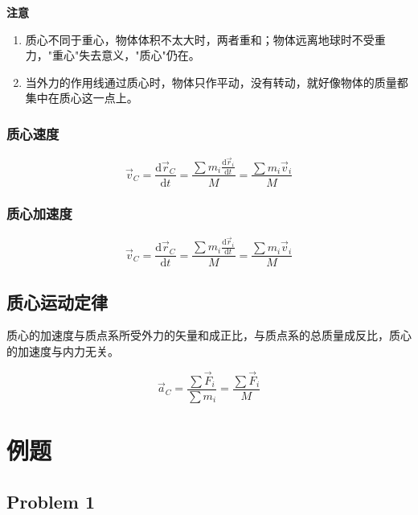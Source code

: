 \documentclass[
	12pt, %
	a4paper, %
]{myLegrandOrangeBook}
\newcommand{\rmd}{\mathrm{d}}
\begin{document}
\textbf{注意}

\begin{enumerate}
    \item 质心不同于重心，物体体积不太大时，两者重和；物体远离地球时不受重力，"重心"失去意义，"质心"仍在。
    \item 当外力的作用线通过质心时，物体只作平动，没有转动，就好像物体的质量都集中在质心这一点上。
\end{enumerate}

\subsubsection{质心速度}

\begin{equation}
    \overrightarrow{v}_C=\frac{\rmd \overrightarrow{r}_C}{\rmd t}=\frac{\sum m_i \frac{\rmd \overrightarrow{r}_i}{\rmd t}}{M}=\frac{\sum m_i \overrightarrow{v}_i}{M}
\end{equation}

\subsubsection{质心加速度}

\begin{equation}
    \overrightarrow{v}_C=\frac{\rmd \overrightarrow{r}_C}{\rmd t}=\frac{\sum m_i \frac{\rmd \overrightarrow{r}_i}{\rmd t}}{M}=\frac{\sum m_i \overrightarrow{v}_i}{M}
\end{equation}

\subsection{质心运动定律}

质心的加速度与质点系所受外力的矢量和成正比，与质点系的总质量成反比，质心的加速度与内力无关。

\begin{equation}
    \overrightarrow{a}_C=\frac{\sum \overrightarrow{F}_i}{\sum m_i}=\frac{\sum \overrightarrow{F}_i}{M}
\end{equation}


\section{例题}

\subsection{Problem 1}
\end{document}

